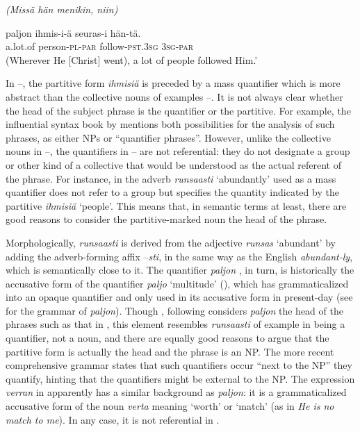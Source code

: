 \documentclass[output=paper]{LSP/langsci}
\begin{document}
\emph{(Missä hän menikin, niin)}

\gll paljon ihmis-i-ä seuras-i hän-tä.\\
a.lot.of person-\textsc{pl}-\textsc{par} follow-\textsc{pst}.\textsc{3sg} \textsc{3sg}-\textsc{par}\\
\glt (Wherever He [Christ] went), a lot of people followed Him.’ %
\z

In --, the partitive form \textit{ihmisiä} is preceded by a mass quantifier which is more abstract than the collective nouns of examples --. It is not always clear whether the head of the subject phrase is the quantifier or the partitive. For example, the influential  syntax book by  \citet[147]{Hakulinenetal1979Nykysuomen} mentions both possibilities for the analysis of such phrases, as either NPs or “quantifier phrases”. However, unlike the collective nouns in --, the quantifiers in -- are not referential: they do not designate a group or other kind of a collective that would be understood as the actual referent of the phrase. For instance, in  the adverb \textit{runsaasti} ‘abundantly’ used as a mass quantifier does not refer to a group but specifies the quantity indicated by the partitive \textit{ihmisiä} ‘people’. This means that, in semantic terms at least, there are good reasons to consider the partitive-marked noun the head of the phrase. 

Morphologically, \textit{runsaasti} is derived from the adjective \textit{runsas} ‘abundant’ by adding the adverb-forming affix –\textit{sti}, in the same way as the English \textit{abundant-ly}, which is semantically close to it. The quantifier \textit{paljon} , in turn, is historically the accusative form of the quantifier \textit{paljo} ‘multitude’ (\cf \citealt{Tuomikoski1978Objektinsijaisista}), which has grammaticalized into an opaque quantifier and only used in its accusative form in present-day  (see \citealt{Karttunen1975Syntax} for the grammar of \textit{paljon}). Though \citet{Karttunen1975Syntax}, following \citet{Penttil1963Suomen} considers \textit{paljon} the head of the phrases such as that in , this element resembles \textit{runsaasti} of example  in being a quantifier, not a noun, and there are equally good reasons to argue that the partitive form is actually the head and the phrase is an NP. The more recent comprehensive grammar \citep[§657]{Hakulinenetal2004Iso} states that such quantifiers occur “next to the NP” they quantify, hinting that the quantifiers might be external to the NP. The expression \textit{verran} in  apparently has a similar background as \textit{paljon}: it is a grammaticalized accusative form of the noun \textit{verta} meaning ‘worth’ or ‘match’ (as in \textit{He is no match to me}). In any case, it is not referential in .
\end{document}
